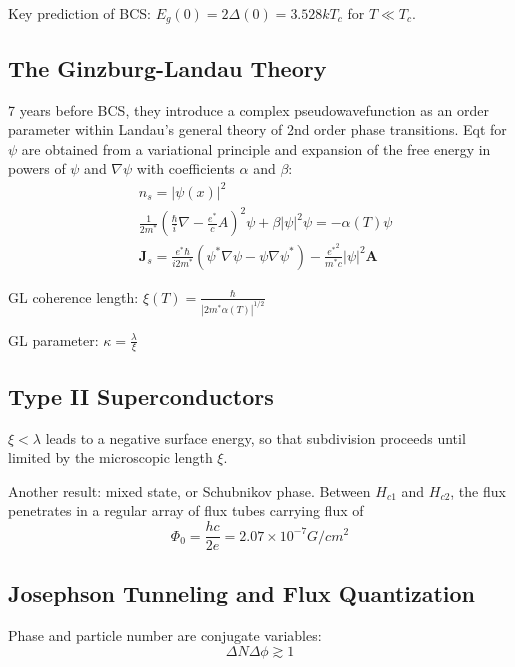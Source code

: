 \documentclass[8pt,a4paper,twocolumn]{article} %
\numberwithin{equation}{section} %
\begin{document}
			Key prediction of BCS: $E_g(0) = 2 \Delta(0) =3.528kT_c $ for $T\ll T_c$.


		\subsection{The Ginzburg-Landau Theory} %
		\label{sub:the_ginzburg_landau_theory}
			7 years before BCS, they introduce a complex pseudowavefunction as an order parameter within Landau's general theory of 2nd order phase transitions. Eqt for $\psi$ are obtained from a variational principle and expansion of the free energy in powers of $\psi$ and $\nabla \psi$ with coefficients $\alpha$ and $\beta$:
			\begin{align}
				&n_s = \left| \psi(x) \right|^2\\
				&\frac{1}{2m^*}\left( \frac{\hbar}{i}\nabla -\frac{e^*}{c}A \right)^2 \psi+\beta|\psi|^2 \psi=-\alpha(T) \psi\\
				&\bm J_s =\frac{e^* \hbar}{i2m^*}(\psi^* \nabla \psi -\psi \nabla \psi^*)-\frac{{e^*}^2}{m^*c}|\psi|^2\bm A
			\end{align}

			GL coherence length: $\xi(T)=\frac{\hbar}{|2m^* \alpha(T) |^{1/2}} $

			GL parameter: $ \kappa = \frac{\lambda}{\xi} $


		\subsection{Type II Superconductors} %
		\label{sub:type_ii_superconductors}
			$\xi<\lambda$ leads to a negative surface energy, so that subdivision proceeds until limited by the microscopic length $\xi$.

			Another result: mixed state, or Schubnikov phase. Between $H_{c1}$ and $ H_{c2} $, the flux penetrates in a regular array of flux tubes carrying flux of
			\begin{equation}
				\Phi_0=\frac{hc}{2e}=2.07\times10^{-7}G/cm^2
			\end{equation}

		\subsection{Josephson Tunneling and Flux Quantization} %
		\label{sub:josephson_tunneling_and_flux_quantization}
			Phase and particle number are conjugate variables:
			\begin{equation}
				\Delta N \Delta \phi \gtrsim 1
			\end{equation}
\end{document}
